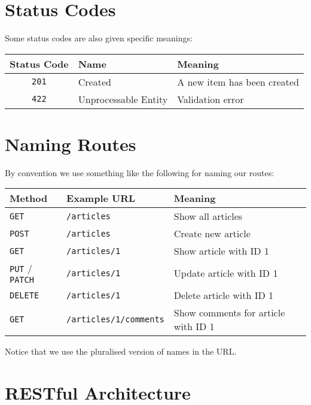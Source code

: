 \section{Status Codes}

Some status codes are also given specific meanings:
\\

\begin{tabularx}{\textwidth}{| c | l | X |}
    \hline
    \textbf{Status Code} & \textbf{Name} & \textbf{Meaning} \\
    \hline
    \texttt{201} & Created & A new item has been created \\
    \texttt{422} & Unprocessable Entity & Validation error \\
    \hline
\end{tabularx}



\section{Naming Routes}

By convention we use something like the following for naming our routes:
\\

\begin{tabularx}{\textwidth}{| l | l | X |}
    \hline
    \textbf{Method} & \textbf{Example URL} & \textbf{Meaning} \\
    \hline
    \texttt{GET} & \texttt{/articles} & Show all articles\\
    \texttt{POST} & \texttt{/articles} & Create new article\\
    \texttt{GET} & \texttt{/articles/1} & Show article with ID 1\\
    \texttt{PUT} / \texttt{PATCH} & \texttt{/articles/1} & Update article with ID 1\\
    \texttt{DELETE} & \texttt{/articles/1} & Delete article with ID 1\\
    \texttt{GET} & \texttt{/articles/1/comments} & Show comments for article with ID 1\\
    \hline
\end{tabularx}

\par\bigskip

Notice that we use the pluralised version of names in the URL.


\pagebreak


\section{RESTful Architecture}

